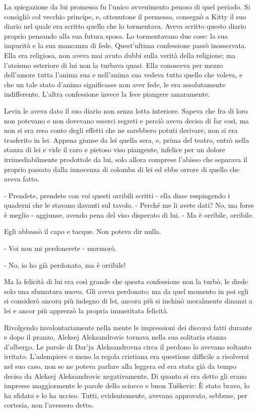 La spiegazione da lui promessa fu l'unico avvenimento penoso di quel periodo. Si consigliò col vecchio principe, e, ottenutone il permesso, consegnò a Kitty il suo diario nel quale era scritto quello che lo tormentava. Aveva scritto questo diario proprio pensando alla sua futura sposa. Lo tormentavano due cose: la sua impurità e la sua mancanza di fede. Quest'ultima confessione passò inosservata. Ella era religiosa, non aveva mai avuto dubbi sulla verità della religione; ma l'ateismo esteriore di lui non la turbava quasi. Ella conosceva per mezzo dell'amore tutta l'anima sua e nell'anima sua vedeva tutto quello che voleva, e che un tale stato d'animo significasse non aver fede, le era assolutamente indifferente. L'altra confessione invece la fece piangere amaramente. 

Levin le aveva dato il suo diario non senza lotta interiore. Sapeva che fra di loro non potevano e non dovevano esserci segreti e perciò aveva deciso di far così, ma non si era reso conto degli effetti che ne sarebbero potuti derivare, non si era trasferito in lei. Appena giunse da lei quella sera, e, prima del teatro, entrò nella stanza di lei e vide il caro e pietoso viso piangente, infelice per un dolore irrimediabilmente prodottole da lui, solo allora comprese l'abisso che separava il proprio passato dalla innocenza di colomba di lei ed ebbe orrore di quello che aveva fatto. 

- Prendete, prendete con voi questi orribili scritti - ella disse respingendo i quaderni che le stavano davanti sul tavolo. - Perché me li avete dati? No, ma forse è meglio - aggiunse, avendo pena del viso disperato di lui. - Ma è orribile, orribile. 

Egli abbassò il capo e tacque. Non poteva dir nulla. 

- Voi non mi perdonerete - mormorò. 

- No, io ho già perdonato, ma è orribile! 

Ma la felicità di lui era così grande che questa confessione non la turbò, le diede solo una sfumatura nuova. Gli aveva perdonato; ma da quel momento in poi egli si considerò ancora più indegno di lei, ancora più si inchinò moralmente dinanzi a lei e ancor più apprezzò la propria immeritata felicità. 

Rivolgendo involontariamente nella mente le impressioni dei discorsi fatti durante e dopo il pranzo, Aleksej Aleksandrovic tornava nella sua solitaria stanza d'albergo. Le parole di Dar'ja Aleksandrovna circa il perdono lo avevano soltanto irritato. L'adempiere o meno la regola cristiana era questione difficile a risolversi nel suo caso, non se ne poteva parlare alla leggera ed era stata già da tempo decisa da Aleksej Aleksandrovic negativamente. Di quanto si era detto gli erano impresse maggiormente le parole dello sciocco e buon Tuškevic: È stato bravo, lo ha sfidato e lo ha ucciso. Tutti, evidentemente, avevano approvato, sebbene, per cortesia, non l'avessero detto. 

